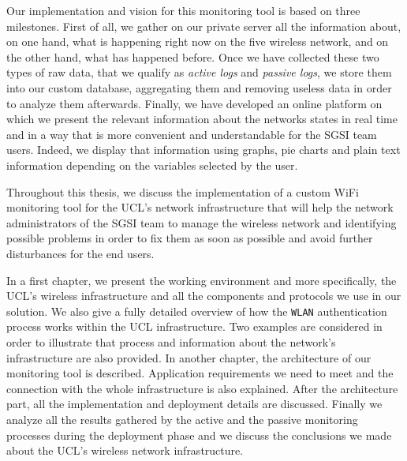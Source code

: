 Our implementation and vision for this monitoring tool is based on three milestones. First of all, we gather on our private server all the information about, on one hand, what is happening right now on the five wireless network, and on the other hand, what has happened before. Once we have collected these two types of raw data, that we qualify as \textit{active logs} and \textit{passive logs}, we store them into our custom database, aggregating them and removing useless data in order to analyze them afterwards. Finally, we have developed an online platform on which we present the relevant information about the networks states in real time and in a way that is more convenient and understandable for the SGSI team users. Indeed, we display that information using graphs, pie charts and plain text information depending on the variables selected by the user.

Throughout this thesis, we discuss the implementation of a custom WiFi monitoring tool for the UCL's network infrastructure that will help the network administrators of the SGSI team to manage the wireless network and identifying possible problems in order to fix them as soon as possible and avoid further disturbances for the end users. 


In a first chapter, we present the working environment and more specifically, the UCL's wireless infrastructure and all the components and protocols we use in our solution. We also give a fully detailed overview of how the \texttt{WLAN} authentication process works within the UCL infrastructure. Two examples are considered in order to illustrate that process and information about the network's infrastructure are also provided. In another chapter, the architecture of our monitoring tool is described. Application requirements we need to meet and the connection with the whole infrastructure is also explained. After the architecture part, all the implementation and deployment details are discussed. Finally we analyze all the results gathered by the active and the passive monitoring processes during the deployment phase and we discuss the conclusions we made about the UCL's wireless network infrastructure.





